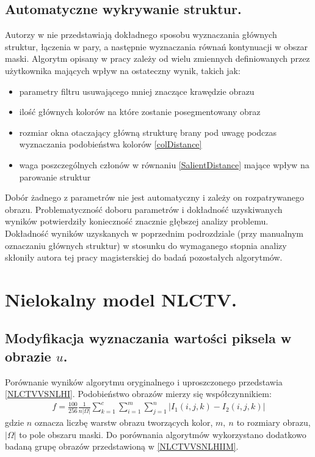 \documentclass[12pt, twoside, openany]{report}
\theoremstyle{definition}
\begin{document}
\subsection{Automatyczne wykrywanie struktur.}
Autorzy w \cite{SalientStrucTexProp} nie przedstawiają dokładnego sposobu wyznaczania głównych struktur, łączenia w pary, a następnie wyznaczania równań kontynuacji w obszar maski. Algorytm opisany w pracy zależy od wielu zmiennych definiowanych przez użytkownika mających wpływ na ostateczny wynik, takich jak:
\begin{itemize}
\item parametry filtru usuwającego mniej znaczące krawędzie obrazu
\item ilość głównych kolorów na które zostanie posegmentowany obraz
\item rozmiar okna otaczający główną strukturę brany pod uwagę podczas wyznaczania podobieństwa kolorów \eqref{colDistance}
\item waga poszczególnych członów w równaniu \eqref{SalientDistance} mające wpływ na parowanie struktur
\end{itemize}
Dobór żadnego z parametrów nie jest automatyczny i zależy on rozpatrywanego obrazu. Problematyczność doboru parametrów i dokładność uzyskiwanych wyników potwierdziły konieczność znacznie głębszej analizy problemu. Dokładność wyników uzyskanych w poprzednim podrozdziale (przy manualnym oznaczaniu głównych struktur) w stosunku do wymaganego stopnia analizy skłoniły autora tej pracy magisterskiej do badań pozostałych algorytmów.
\section{Nielokalny model NLCTV.}
\subsection{Modyfikacja wyznaczania wartości piksela w obrazie $u$.}
\label{ssec:NLCTVModSec}
Porównanie wyników algorytmu oryginalnego i uproszczonego przedstawia \autoref{NLCTVVSNLHI}. Podobieństwo obrazów mierzy się współczynnikiem:
\begin{align}
f = \frac{100}{256}\frac{1}{n| \Omega |} \sum^c_{k=1}{\sum^m_{i=1}{\sum^n_{j=1}{ | I_1(i,j,k)-I_2(i,j,k) |}}} %
\end{align}
gdzie $n$ oznacza liczbę warstw obrazu tworzących kolor, $m, \ n$ to rozmiary obrazu, $|\Omega|$ to pole obszaru maski. Do porównania algorytmów wykorzystano dodatkowo badaną grupę obrazów przedstawioną w \autoref{NLCTVVSNLHIIM}.
\end{document}
